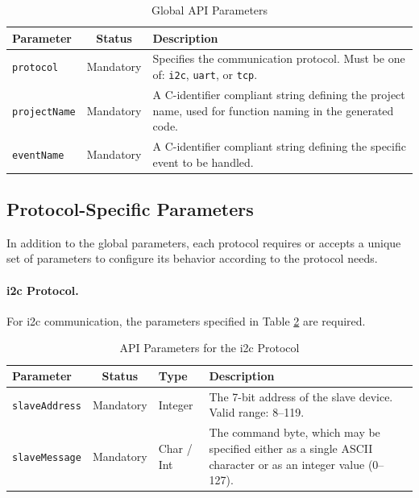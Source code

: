 \begin{table}[h!]
    \centering
    \caption{Global API Parameters}
    \label{tab:global_params}
    \begin{tabular}{|l|c|p{9cm}|}
        \hline
        \textbf{Parameter} & \textbf{Status} & \textbf{Description} \\ \hline
        \texttt{protocol} & Mandatory & Specifies the communication protocol. Must be one of: \texttt{i2c}, \texttt{uart}, or \texttt{tcp}. \\ \hline
        \texttt{projectName} & Mandatory & A C-identifier compliant string defining the project name, used for function naming in the generated code. \\ \hline
        \texttt{eventName} & Mandatory & A C-identifier compliant string defining the specific event to be handled. \\ \hline
    \end{tabular}
\end{table}

\subsection{Protocol-Specific Parameters}
\label{subsec:protocol_params}

In addition to the global parameters, each protocol requires or accepts a unique set of parameters to configure its behavior according to the protocol needs.

\paragraph{\gls{i2c} Protocol.} For \gls{i2c} communication, the parameters specified in Table \ref{tab:i2c_params} are required.

\begin{table}[h!]
    \centering
    \caption{API Parameters for the \gls{i2c} Protocol}
    \label{tab:i2c_params}
    \begin{tabular}{|l|c|l|p{6cm}|}
        \hline
        \textbf{Parameter} & \textbf{Status} & \textbf{Type} & \textbf{Description} \\ \hline
        \texttt{slaveAddress} & Mandatory & Integer & The 7-bit address of the slave device. Valid range: 8–119. \\ \hline
        \texttt{slaveMessage} & Mandatory & Char / Int & The command byte, which may be specified either as a single ASCII character or as an integer value (0–127). \\ \hline
    \end{tabular}
\end{table}

